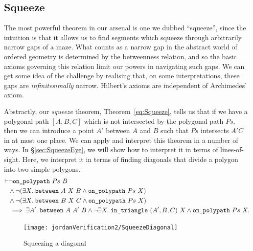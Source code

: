 \subsection{Squeeze}\label{sec:Squeeze}
The most powerful theorem in our arsenal is one we dubbed ``squeeze'', since the intuition is that it allows us to find segments which squeeze through arbitrarily narrow gaps of a maze. What counts as a narrow gap in the abstract world of ordered geometry is  determined by the betweenness relation, and so the basic axioms governing this relation limit our powers in navigating such gaps. We can get some idea of the challenge by realising that, on some interpretations, these gaps are \emph{infinitesimally} narrow. Hilbert's axioms are independent of Archimedes' axiom.

Abstractly, our \emph{squeeze} theorem, Theorem~\ref{eq:Squeeze}, tells us that if we have a polygonal path $[A,B,C]$ which is not intersected by the polygonal path $Ps$, then we can introduce a point $A'$ between $A$ and $B$ such that $Ps$ intersects $A'C$ in at most one place. We can apply and interpret this theorem in a number of ways. In \S\ref{sec:SqueezeEye}, we will show how to interpret it in terms of lines-of-sight. Here, we interpret it in terms of finding diagonals that divide a polygon into two simple polygons.
\begin{equation}\label{eq:Squeeze}
  \begin{aligned}
    \vdash&\neg\texttt{on\_polypath}\ Ps\ B\\
    &\wedge \neg(\exists X.\; \texttt{between}\ A\ X\ B \wedge \texttt{on\_polypath}\ Ps\ X)\\
    &\wedge \neg(\exists X.\; \texttt{between}\ B\ X\ C \wedge \texttt{on\_polypath}\ Ps\ X)\\
    &\implies \exists A'.\; \texttt{between}\ A\ A'\ B \wedge \neg\exists X.\; \texttt{in\_triangle}\ (A',B,C)\ X\wedge \texttt{on\_polypath}\ Ps\ X.
  \end{aligned}
\end{equation}

\begin{figure}
\centering\texttt{[image: jordanVerification2/SqueezeDiagonal]}
\caption{Squeezing a diagonal}
\label{fig:SqueezeDiagonal}
\end{figure}

